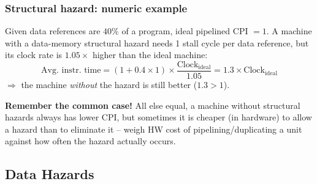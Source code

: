 \begin{center}
\end{center}

\subsubsection{Structural hazard: numeric example}

\begin{eg}
Given data references are $40\%$ of a program, ideal pipelined CPI $=1$. A
machine with a data-memory structural hazard needs 1 stall cycle per data
reference, but its clock rate is $1.05\times$ higher than the ideal
machine:
\[
  \text{Avg.\ instr.\ time} = (1+0.4\times1)\times\frac{\text{Clock}_{\text{ideal}}}{1.05} = 1.3\times \text{Clock}_{\text{ideal}}
\]
$\Rightarrow$ the machine \emph{without} the hazard is still better ($1.3 >
1$).
\end{eg}

\begin{remark}
\textbf{Remember the common case!} All else equal, a machine without
structural hazards always has lower CPI, but sometimes it is cheaper (in
hardware) to allow a hazard than to eliminate it -- weigh HW cost of
pipelining/duplicating a unit against how often the hazard actually occurs.
\end{remark}

\subsection{Data Hazards}

